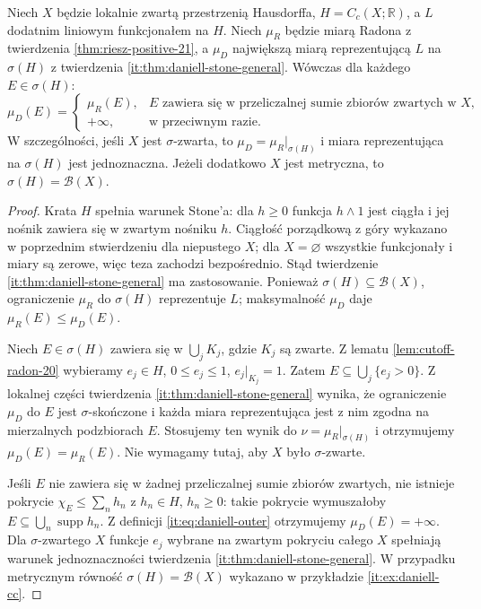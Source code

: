 \begin{twierdzenie}
\label{it:thm:daniell-radon-comparison}
Niech $X$ będzie lokalnie zwartą przestrzenią Hausdorffa,
$H=C_c(X;\mathbb R)$, a $L$ dodatnim liniowym
funkcjonałem na $H$. Niech $\mu_R$ będzie miarą Radona
z twierdzenia \ref{thm:riesz-positive-21}, a $\mu_D$
największą miarą reprezentującą $L$ na $\sigma(H)$
z twierdzenia \ref{it:thm:daniell-stone-general}.
Wówczas dla każdego $E\in\sigma(H)$:
\[
 \mu_D(E)=
 \begin{cases}
 \mu_R(E),& E\text{ zawiera się w przeliczalnej sumie
 zbiorów zwartych w }X,\\
 +\infty,&\text{w przeciwnym razie}.
 \end{cases}
\]
W szczególności, jeśli $X$ jest $\sigma$-zwarta,
to $\mu_D=\mu_R|_{\sigma(H)}$ i miara reprezentująca
na $\sigma(H)$ jest jednoznaczna. Jeżeli dodatkowo
$X$ jest metryczna, to $\sigma(H)=\mathcal B(X)$.
\end{twierdzenie}
\begin{proof}
Krata $H$ spełnia warunek Stone'a: dla $h\ge0$
funkcja $h\wedge1$ jest ciągła i jej nośnik zawiera się
w zwartym nośniku $h$. Ciągłość porządkową z góry
wykazano w poprzednim stwierdzeniu dla niepustego
$X$; dla $X=\varnothing$ wszystkie funkcjonały
i miary są zerowe, więc teza zachodzi bezpośrednio.
Stąd twierdzenie \ref{it:thm:daniell-stone-general}
ma zastosowanie. Ponieważ $\sigma(H)\subseteq\mathcal B(X)$,
ograniczenie $\mu_R$ do $\sigma(H)$ reprezentuje $L$;
maksymalność $\mu_D$ daje $\mu_R(E)\le\mu_D(E)$.

Niech $E\in\sigma(H)$ zawiera się w $\bigcup_jK_j$,
gdzie $K_j$ są zwarte. Z lematu
\ref{lem:cutoff-radon-20} wybieramy $e_j\in H$,
$0\le e_j\le1$, $e_j|_{K_j}=1$.
Zatem $E\subseteq\bigcup_j\{e_j>0\}$.
Z lokalnej części twierdzenia
\ref{it:thm:daniell-stone-general} wynika, że
ograniczenie $\mu_D$ do $E$ jest $\sigma$-skończone
i każda miara reprezentująca jest z nim zgodna
na mierzalnych podzbiorach $E$. Stosujemy ten wynik
do $\nu=\mu_R|_{\sigma(H)}$ i otrzymujemy
$\mu_D(E)=\mu_R(E)$. Nie wymagamy tutaj, aby
$X$ było $\sigma$-zwarte.

Jeśli $E$ nie zawiera się w żadnej przeliczalnej sumie
zbiorów zwartych, nie istnieje pokrycie
$\chi_E\le\sum_n h_n$ z $h_n\in H$, $h_n\ge0$:
takie pokrycie wymuszałoby
$E\subseteq\bigcup_n\operatorname{supp}h_n$.
Z definicji \eqref{it:eq:daniell-outer}
otrzymujemy $\mu_D(E)=+\infty$.
Dla $\sigma$-zwartego $X$ funkcje $e_j$ wybrane
na zwartym pokryciu całego $X$ spełniają warunek
jednoznaczności twierdzenia
\ref{it:thm:daniell-stone-general}.
W przypadku metrycznym równość $\sigma(H)=\mathcal B(X)$
wykazano w przykładzie \ref{it:ex:daniell-cc}.
\end{proof}

